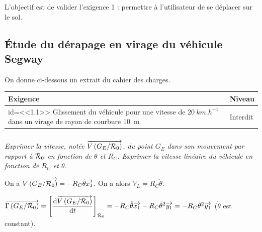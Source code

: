 \documentclass[10pt,fleqn]{article} %
\newif\ifnormal
\begin{document}
\begin{multicols}{2}
\begin{obj}
L'objectif est de valider l'exigence 1 : permettre à l'utilisateur de se déplacer sur le sol.
\end{obj}

\subsection*{Étude du dérapage en virage du véhicule Segway}
\ifprof

\else
On donne ci-dessous un extrait du cahier des charges.

\begin{center}
\begin{tabular}{|p{.7\linewidth}|p{.2\linewidth}|}
\hline 
Exigence & Niveau \\
\hline
id=<<1.1>> Glissement du véhicule pour une vitesse de $\SI{20}{km.h^{-1}}$ dans un virage de rayon de courbure \SI{10}{m} 
& Interdit \\
\hline
\end{tabular}
\end{center}

\fi

\subparagraph{}\textit{Exprimer la vitesse, notée  $\overrightarrow{V\left(G_E /\mathcal{R}_{0}\right)}$, du point $G_E$ dans son mouvement par rapport à $\rep{0}$ en fonction de $\dot{\theta}$ et $R_C$. Exprimer la vitesse linéaire du véhicule en fonction de $R_C$ et $\dot{\theta}$.}

\ifprof
\begin{corrige}
On a $\overrightarrow{V\left(G_E /\mathcal{R}_{0}\right)}=-R_C\dot{\theta}\overrightarrow{x_1}$. On a alors $V_L=R_C\dot{\theta}$. 
\end{corrige}
\else
\fi

\ifnormal
\subparagraph{}\textit{Exprimer l'accélération, notée  $\vect{\Gamma \left(G_E /\rep{0}\right)}$, du point $G_E$ dans son mouvement par rapport à $\rep{0}$ en fonction de $\dot{\theta}$ et $R_C$.}
\else
\fi


\ifprof
\begin{corrige}
$\overrightarrow{\Gamma \left(G_E /\mathcal{R}_{0}\right)}=\left[\dfrac{\text{d} \overrightarrow{V\left(G_E /\mathcal{R}_{0}\right)}}{\text{d} t}\right]_{\mathcal{R}_{0}}= 
-R_C\ddot{\theta}\overrightarrow{x_1}-R_C\dot{\theta}^2\overrightarrow{y_1}=-R_C\dot{\theta}^2\overrightarrow{y_1}$ ($\dot{\theta}$ est constant).
\end{corrige}
\else
\fi


\end{multicols}
\end{document}
